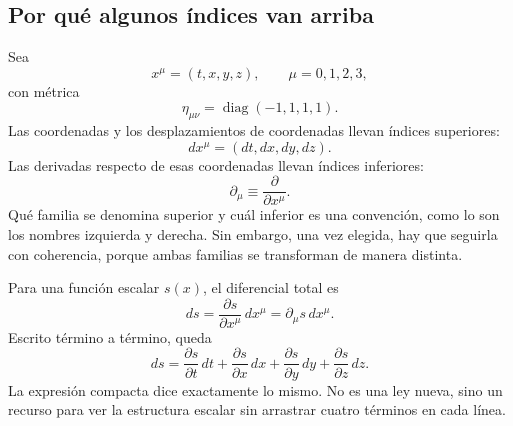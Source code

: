 \subsection{Por qué algunos índices van arriba}

Sea
\begin{equation}
x^\mu=(t,x,y,z),
\qquad
\mu=0,1,2,3,
\end{equation}
con métrica
\begin{equation}
\eta_{\mu\nu}
=
\operatorname{diag}(-1,1,1,1).
\label{eq:sr7-metric}
\end{equation}
Las coordenadas y los desplazamientos de coordenadas llevan índices superiores:
\begin{equation}
dx^\mu=(dt,dx,dy,dz).
\end{equation}
Las derivadas respecto de esas coordenadas llevan índices inferiores:
\begin{equation}
\partial_\mu
\equiv
\frac{\partial}{\partial x^\mu}.
\label{eq:sr7-gradient}
\end{equation}
Qué familia se denomina superior y cuál inferior es una convención, como lo son los nombres izquierda y derecha. Sin embargo, una vez elegida, hay que seguirla con coherencia, porque ambas familias se transforman de manera distinta.

\begin{classroomqa}
\end{classroomqa}

Para una función escalar \(s(x)\), el diferencial total es
\begin{equation}
ds
=
\frac{\partial s}{\partial x^\mu}\,dx^\mu
=
\partial_\mu s\,dx^\mu.
\label{eq:sr7-total-differential}
\end{equation}
Escrito término a término, queda
\begin{equation}
ds
=
\frac{\partial s}{\partial t}\,dt
+\frac{\partial s}{\partial x}\,dx
+\frac{\partial s}{\partial y}\,dy
+\frac{\partial s}{\partial z}\,dz.
\end{equation}
La expresión compacta dice exactamente lo mismo. No es una ley nueva, sino un recurso para ver la estructura escalar sin arrastrar cuatro términos en cada línea.


